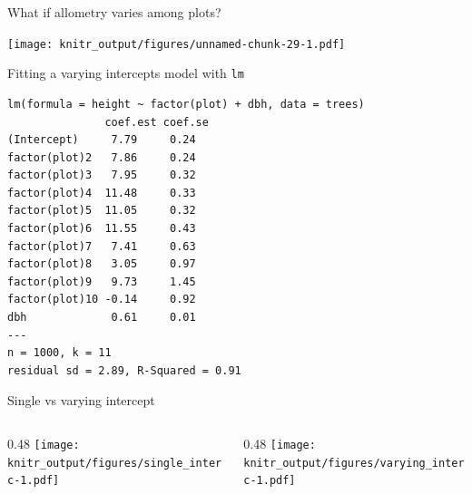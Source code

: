\documentclass[10pt,ignorenonframetext,]{beamer}
\def\begincols{\begin{columns}[c]}
\def\endcols{\end{columns}}
\def\begincol{\begin{column}{0.48\textwidth}}
\def\endcol{\end{column}}
\begin{document}
\begin{frame}{What if allometry varies among plots?}

\texttt{[image: knitr\_output/figures/unnamed-chunk-29-1.pdf]}

\end{frame}

\begin{frame}[fragile]{Fitting a varying intercepts model with
\texttt{lm}}

\begin{verbatim}
lm(formula = height ~ factor(plot) + dbh, data = trees)
               coef.est coef.se
(Intercept)     7.79     0.24  
factor(plot)2   7.86     0.24  
factor(plot)3   7.95     0.32  
factor(plot)4  11.48     0.33  
factor(plot)5  11.05     0.32  
factor(plot)6  11.55     0.43  
factor(plot)7   7.41     0.63  
factor(plot)8   3.05     0.97  
factor(plot)9   9.73     1.45  
factor(plot)10 -0.14     0.92  
dbh             0.61     0.01  
---
n = 1000, k = 11
residual sd = 2.89, R-Squared = 0.91
\end{verbatim}

\end{frame}

\begin{frame}{Single vs varying intercept}

\begincols
\begincol
\texttt{[image: knitr\_output/figures/single\_interc-1.pdf]} \endcol

\begincol
\texttt{[image: knitr\_output/figures/varying\_interc-1.pdf]} \endcol
\endcols

\end{frame}
\end{document}
